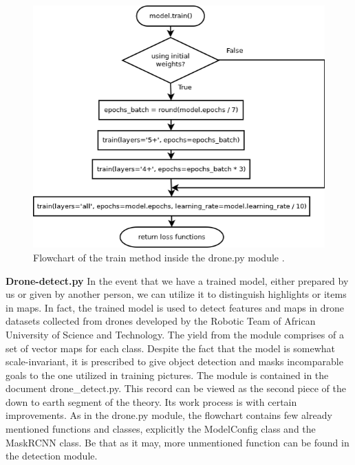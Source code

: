  \begin{figure}[H]
  \centering
  \includegraphics[width=0.8\linewidth]{images/train-graph.png}
  \caption{Flowchart of the train method inside the drone.py module .}
 \end{figure}
 \label{train}
 \clearpage

\textbf{Drone-detect.py}
In the event that we have a trained model, either prepared by us or given by another person, we can utilize it to distinguish highlights or items in maps. In fact, the trained model is used to detect features and maps in drone datasets collected from drones developed by the Robotic Team of African University of Science and Technology.  The yield from 
the module comprises of a set of vector maps for each class. Despite the fact that the model is somewhat scale-invariant, it is prescribed to give object detection and masks incomparable 
goals to the one utilized in training pictures.  The module is contained in the document drone\_detect.py. This record can be viewed as the second piece of the down to earth 
segment of the theory. Its work process is with certain improvements. As in the drone.py module, the flowchart contains few already mentioned 
functions and classes, explicitly the ModelConfig class  and the MaskRCNN class. Be that as it may, more unmentioned function can be found in the detection module.  

